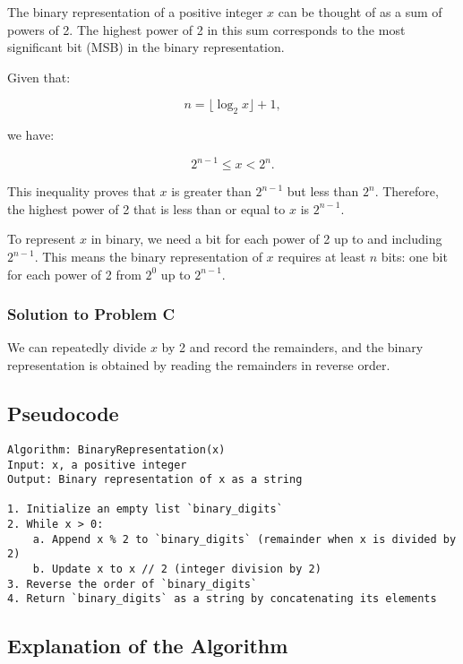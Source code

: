 \documentclass{article}
\begin{document}
\begin{itemize}
The binary representation of a positive integer \( x \) can be thought of as a sum of powers of 2. The highest power of 2 in this sum corresponds to the most significant bit (MSB) in the binary representation.

Given that:

\[
n = \lfloor \log_2 x \rfloor + 1,
\]

we have:

\[
2^{n-1} \leq x < 2^n.
\]

This inequality proves that \( x \) is greater than \( 2^{n-1} \) but less than \( 2^n \). Therefore, the highest power of 2 that is less than or equal to \( x \) is \( 2^{n-1} \).

To represent \( x \) in binary, we need a bit for each power of 2 up to and including \( 2^{n-1} \). This means the binary representation of \( x \) requires at least \( n \) bits: one bit for each power of 2 from \( 2^0 \) up to \( 2^{n-1} \).

\subsubsection*{Solution to Problem C}

We can repeatedly divide \( x \) by 2 and record the remainders, and the binary representation is obtained by reading the remainders in reverse order.

\subsection*{Pseudocode}

\begin{verbatim}
Algorithm: BinaryRepresentation(x)
Input: x, a positive integer
Output: Binary representation of x as a string

1. Initialize an empty list `binary_digits`
2. While x > 0:
    a. Append x % 2 to `binary_digits` (remainder when x is divided by 2)
    b. Update x to x // 2 (integer division by 2)
3. Reverse the order of `binary_digits`
4. Return `binary_digits` as a string by concatenating its elements
\end{verbatim}

\subsection*{Explanation of the Algorithm}


\end{itemize}
\end{document}

